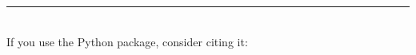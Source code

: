 \vspace*{\fill}
\rule{\textwidth}{0.5pt}
\\[1ex]
\footnotesize
If you use the \ocdb{} Python package, consider citing it:\\ \hspace*{\fill}
